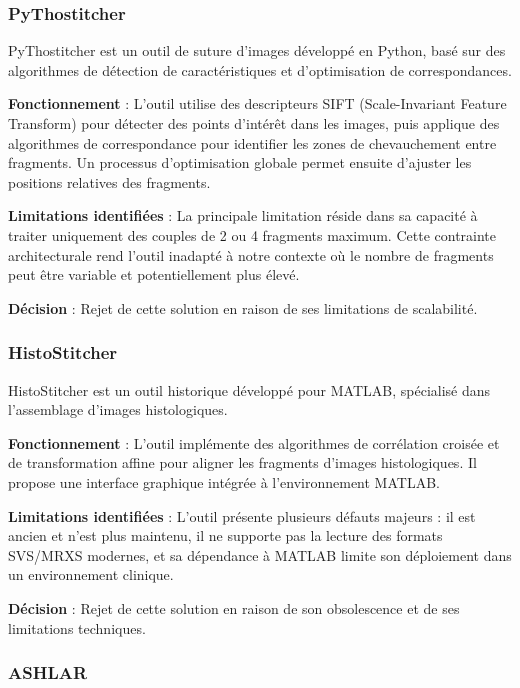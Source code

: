 \documentclass[12pt,a4paper]{report}
\begin{document}
\subsubsection{PyThostitcher}

PyThostitcher est un outil de suture d'images développé en Python, basé sur des algorithmes de détection de caractéristiques et d'optimisation de correspondances.

\textbf{Fonctionnement} : L'outil utilise des descripteurs SIFT (Scale-Invariant Feature Transform) pour détecter des points d'intérêt dans les images, puis applique des algorithmes de correspondance pour identifier les zones de chevauchement entre fragments. Un processus d'optimisation globale permet ensuite d'ajuster les positions relatives des fragments.

\textbf{Limitations identifiées} : La principale limitation réside dans sa capacité à traiter uniquement des couples de 2 ou 4 fragments maximum. Cette contrainte architecturale rend l'outil inadapté à notre contexte où le nombre de fragments peut être variable et potentiellement plus élevé.

\textbf{Décision} : Rejet de cette solution en raison de ses limitations de scalabilité.

\subsubsection{HistoStitcher}

HistoStitcher est un outil historique développé pour MATLAB, spécialisé dans l'assemblage d'images histologiques.

\textbf{Fonctionnement} : L'outil implémente des algorithmes de corrélation croisée et de transformation affine pour aligner les fragments d'images histologiques. Il propose une interface graphique intégrée à l'environnement MATLAB.

\textbf{Limitations identifiées} : L'outil présente plusieurs défauts majeurs : il est ancien et n'est plus maintenu, il ne supporte pas la lecture des formats SVS/MRXS modernes, et sa dépendance à MATLAB limite son déploiement dans un environnement clinique.

\textbf{Décision} : Rejet de cette solution en raison de son obsolescence et de ses limitations techniques.

\subsubsection{ASHLAR}
\end{document}
